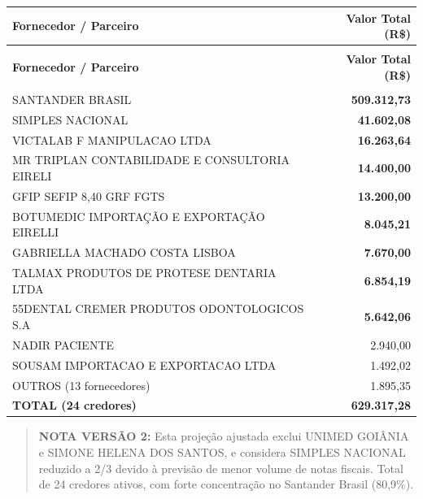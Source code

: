 \documentclass[12pt, a4paper]{article}
\begin{document}
\begin{longtable}{>{\raggedright\arraybackslash}p{9cm} r}
    \toprule
    \rowcolor{tableHeader} \textbf{Fornecedor / Parceiro} & \textbf{Valor Total (R\$)} \\
    \midrule
    \endfirsthead

    \multicolumn{2}{c}{{\tablename\ \thetable{} -- continuação}} \\
    \toprule
    \rowcolor{tableHeader} \textbf{Fornecedor / Parceiro} & \textbf{Valor Total (R\$)} \\
    \midrule
    \endhead

    \midrule
    \multicolumn{2}{r}{\textit{Continua na próxima página...}} \\
    \endfoot

    \bottomrule
    \endlastfoot

    SANTANDER BRASIL & \textcolor{accentColor}{\textbf{509.312,73}} \\
    SIMPLES NACIONAL & \textcolor{accentColor}{\textbf{41.602,08}} \\
    VICTALAB F MANIPULACAO LTDA & \textcolor{accentColor}{\textbf{16.263,64}} \\
    MR TRIPLAN CONTABILIDADE E CONSULTORIA EIRELI & \textcolor{accentColor}{\textbf{14.400,00}} \\
    GFIP SEFIP 8,40 GRF FGTS & \textcolor{accentColor}{\textbf{13.200,00}} \\
    BOTUMEDIC IMPORTAÇÃO E EXPORTAÇÃO EIRELLI & \textcolor{accentColor}{\textbf{8.045,21}} \\
    GABRIELLA MACHADO COSTA LISBOA & \textcolor{accentColor}{\textbf{7.670,00}} \\
    TALMAX PRODUTOS DE PROTESE DENTARIA LTDA & \textcolor{accentColor}{\textbf{6.854,19}} \\
    55DENTAL CREMER PRODUTOS ODONTOLOGICOS S.A & \textcolor{accentColor}{\textbf{5.642,06}} \\
    NADIR PACIENTE & 2.940,00 \\
    SOUSAM IMPORTACAO E EXPORTACAO LTDA & 1.492,02 \\
    OUTROS (13 fornecedores) & 1.895,35 \\
    \midrule
    \rowcolor{lightGray} \textbf{TOTAL (24 credores)} & \textbf{629.317,28} \\
\end{longtable}

\vspace{-0.3cm}
\begin{quote}
    \footnotesize \textbf{NOTA VERSÃO 2:} Esta projeção ajustada exclui UNIMED GOIÂNIA e SIMONE HELENA DOS SANTOS, e considera SIMPLES NACIONAL reduzido a 2/3 devido à previsão de menor volume de notas fiscais. Total de 24 credores ativos, com forte concentração no Santander Brasil (80,9\%).
\end{quote}
\end{document}
